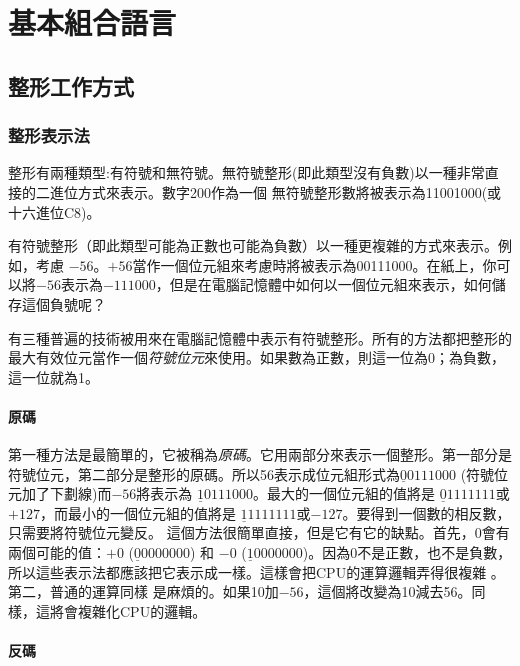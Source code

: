 
\chapter{基本組合語言}

\section{整形工作方式 }

\subsection{整形表示法 }

整形有兩種類型:有符號和無符號。無符號整形(即此類型沒有負數)以一種非常直接的二進位方式來表示。數字200作為一個
無符號整形數將被表示為11001000(或十六進位C8)。 

有符號整形（即此類型可能為正數也可能為負數）以一種更複雜的方式來表示。例如，考慮
$-56$。$+56$當作一個位元組來考慮時將被表示為00111000。在紙上，你可以將$-56$表示為$-111000$，但是在電腦記憶體中如何以一個位元組來表示，如何儲存這個負號呢？

有三種普遍的技術被用來在電腦記憶體中表示有符號整形。所有的方法都把整形的最大有效位元當作一個\emph{符號位元}來使用。如果數為正數，則這一位為0；為負數，這一位就為1。
\subsubsection{原碼 }

第一種方法是最簡單的，它被稱為\emph{原碼}。它用兩部分來表示一個整形。第一部分是符號位元，第二部分是整形的原碼。所以56表示成位元組形式為$\underline{0}0111000$
(符號位元加了下劃線)而$-56$將表示為
$\underline{1}0111000$。最大的一個位元組的值將是
$\underline{0}1111111$或$+127$，而最小的一個位元組的值將是
$\underline{1}1111111$或$-127$。要得到一個數的相反數，只需要將符號位元變反。
這個方法很簡單直接，但是它有它的缺點。首先，0會有兩個可能的值：$+0$
($\underline{0}0000000$) 和 $-0$
($\underline{1}0000000$)。因為0不是正數，也不是負數，所以這些表示法都應該把它表示成一樣。這樣會把CPU的運算邏輯弄得很複雜
。第二，普通的運算同樣
是麻煩的。如果10加$-56$，這個將改變為10減去56。同樣，這將會複雜化CPU的邏輯。

\subsubsection{反碼 }


